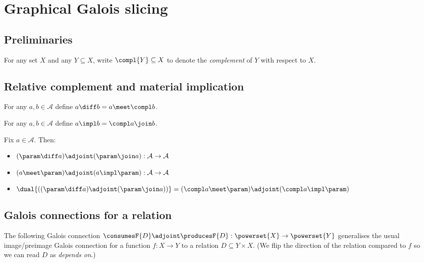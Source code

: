 \section{Graphical Galois slicing}
\label{sec:graph}

\subsection{Preliminaries}

\begin{definition}[Complement]
   For any set $X$ and any $Y \subseteq X$, write $\compl{Y} \subseteq X$ to denote the \textit{complement} of $Y$
   with respect to $X$.
\end{definition}

\subsection{Relative complement and material implication}

\begin{definition}
   For any $a, b  \in \mathcal{A}$ define $a \diff b = a \meet \compl b$.
\end{definition}

\begin{definition}
   For any $a, b  \in \mathcal{A}$ define $a \impl b = \compl a \join b$.
\end{definition}

\begin{lemma}
   Fix $a \in \mathcal{A}$. Then:
   \begin{itemize}
      \item $(\param \diff a) \adjoint (\param \join a): \mathcal{A} \to \mathcal{A}$
      \item $(a \meet \param) \adjoint (a \impl \param): \mathcal{A} \to \mathcal{A}$
      \item $\dual{((\param \diff a) \adjoint (\param \join a))} = (\compl a \meet \param) \adjoint (\compl a \impl \param)$
   \end{itemize}
\end{lemma}

\subsection{Galois connections for a relation}

The following Galois connection $\consumesF{D} \adjoint \producesF{D}: \powerset{X} \to \powerset{Y}$
generalises the usual image/preimage Galois connection for a function $f: X \to Y$ to a relation $D \subseteq
Y \times X$. (We flip the direction of the relation compared to $f$ so we can read $D$ as \emph{depends on}.)

